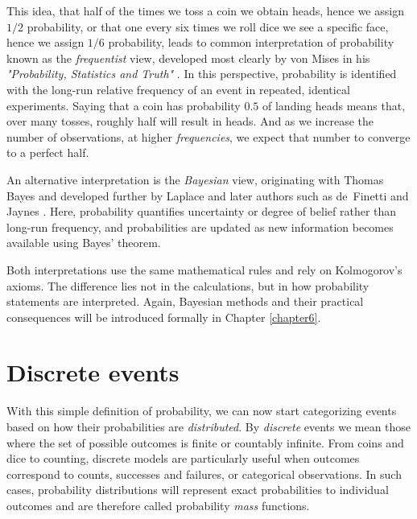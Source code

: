 \medskip

This idea, that half of the times we toss a coin we obtain heads, hence we assign $1/2$ probability, or that one every six times we roll dice we see a specific face, hence we assign $1/6$ probability, leads to common interpretation of probability known as the \textit{frequentist} view, developed most clearly by von Mises in his \textit{{"Probability, Statistics and Truth"}} \cite{vonmises_1928_truth}. In this perspective, probability is identified with the long-run relative frequency of an event in repeated, identical experiments. Saying that a coin has probability $0.5$ of landing heads means that, over many tosses, roughly half will result in heads. And as we increase the number of observations, at higher \textit{frequencies}, we expect that number to converge to a perfect half.

\medskip

An alternative interpretation is the \textit{Bayesian} view, originating with Thomas Bayes \cite{bayes_1763_doctrine} and developed further by Laplace and later authors such as de~Finetti \cite{definetti_1974_probability} and Jaynes \cite{jaynes_2003_logic}. Here, probability quantifies uncertainty or degree of belief rather than long-run frequency, and probabilities are updated as new information becomes available using Bayes' theorem.

\medskip

Both interpretations use the same mathematical rules and rely on Kolmogorov's axioms. The difference lies not in the calculations, but in how probability statements are interpreted. Again, Bayesian methods and their practical consequences will be introduced formally in Chapter \ref{chapter6}.

\section{Discrete events}

With this simple definition of probability, we can now start categorizing events based on how their probabilities are \textit{distributed}. By \textit{discrete} events we mean those where the set of possible outcomes is finite or countably infinite. From coins and dice to counting, discrete models are particularly useful when outcomes correspond to counts, successes and failures, or categorical observations. In such cases, probability distributions will represent exact probabilities to individual outcomes and are therefore called probability \textit{mass} functions. 

